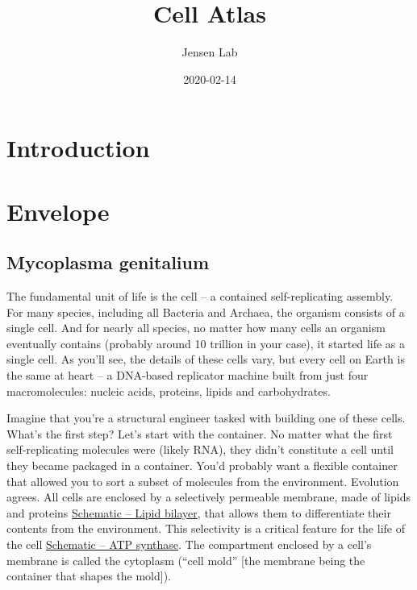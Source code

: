 \documentclass[]{tufte-book}
\title{Cell Atlas}
\author{Jensen Lab}
\date{2020-02-14}
\begin{document}
\maketitle



{
\setcounter{tocdepth}{1}
\tableofcontents
}

\chapter{Introduction}\label{introduction}

\chapter{Envelope}\label{envelope}

\section{Mycoplasma genitalium}\label{mycoplasma-genitalium}

The fundamental unit of life is the cell -- a contained self-replicating
assembly. For many species, including all Bacteria and Archaea, the
organism consists of a single cell. And for nearly all species, no
matter how many cells an organism eventually contains (probably around
10 trillion in your case), it started life as a single cell. As you'll
see, the details of these cells vary, but every cell on Earth is the
same at heart -- a DNA-based replicator machine built from just four
macromolecules: nucleic acids, proteins, lipids and carbohydrates.

Imagine that you're a structural engineer tasked with building one of
these cells. What's the first step? Let's start with the container. No
matter what the first self-replicating molecules were (likely RNA), they
didn't constitute a cell until they became packaged in a container.
You'd probably want a flexible container that allowed you to sort a
subset of molecules from the environment. Evolution agrees. All cells
are enclosed by a selectively permeable membrane, made of lipids and
proteins \protect\hyperlink{fig:2-1-1}{Schematic -- Lipid bilayer}, that
allows them to differentiate their contents from the environment. This
selectivity is a critical feature for the life of the cell
\protect\hyperlink{fig:2-1-2}{Schematic -- ATP synthase}. The
compartment enclosed by a cell's membrane is called the cytoplasm
(``cell mold'' {[}the membrane being the container that shapes the
mold{]}).
\end{document}
